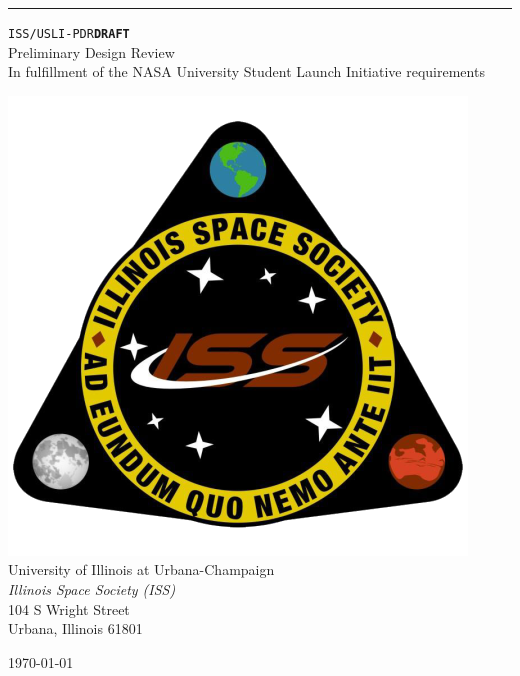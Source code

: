 \documentclass[11pt, letterpaper,oneside]{memoir}
\numberwithin{equation}{section}
\theoremstyle{definition}
\newcommand\docno{ISS/USLI-PDR}
\begin{document}
	
	
	\begin{titlingpage}		
		\raggedleft
		
		\rule{1pt}{\textheight}
		\hspace{0.01\textwidth} %
		\parbox[b]{0.97\textwidth}{ %
			
			{\Large \texttt{\docno}\hfill\texttt{\bfseries DRAFT}}\\[5\baselineskip]
			{\Huge Preliminary Design Review}
			\\
			{\Large In fulfillment of the NASA University Student Launch Initiative requirements}
			\\[3\baselineskip]
			
			\begin{center}
				\includegraphics[width=0.4\linewidth]{ISSlogo_square}\\
				{\Large University of Illinois at Urbana-Champaign}\\[2\baselineskip]
				{\Large\itshape Illinois Space Society (ISS)}\\[1\baselineskip]
				{\large 104 S Wright Street}\\
				{\large Urbana, Illinois 61801}
			\end{center}
			
			
			\vspace{0.2\textheight} %
			\vfill
			
			{\noindent \today}\\[\baselineskip] %
		}
		
	\end{titlingpage}

	\listoffigures
	
\end{document}
